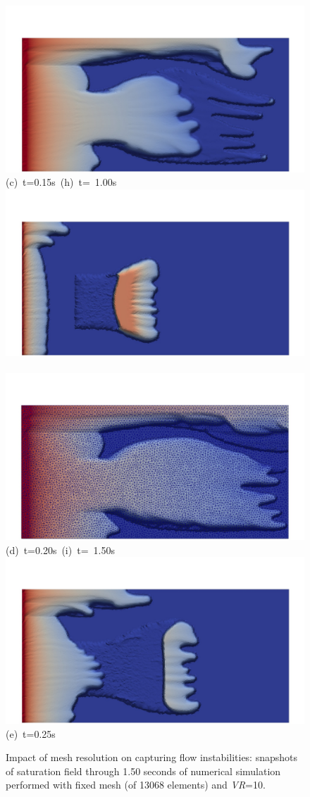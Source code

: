 \begin{figure}[ht]
{{            \includegraphics[width=.45\textwidth]{./Pics1/Section4_4/5r_po_left_inlet_D1000b.pdf}}
      \vspace{-.1cm}\hbox{\hspace{2.cm}(c) t=0.15s \hspace{4cm} (h) t= 1.00s}\vspace{-.1cm}
      \hbox{\includegraphics[width=.45\textwidth]{./Pics1/Section4_4/5r_po_left_inlet_D200b.pdf} 
            \includegraphics[width=.45\textwidth]{./Pics1/Section4_4/5r_po_left_inlet_D1500b.pdf}}
      \vspace{-.1cm}\hbox{\hspace{2.cm}(d) t=0.20s \hspace{4cm} (i) t= 1.50s}\vspace{-.1cm}
      \hbox{\includegraphics[width=.45\textwidth]{./Pics1/Section4_4/5r_po_left_inlet_D250b.pdf}}
      \vspace{-.1cm}\hbox{\hspace{2.cm}(e) t=0.25s}\vspace{-.1cm}}
\caption{Impact of mesh resolution on capturing flow instabilities: snapshots of saturation field through 1.50 seconds of numerical simulation performed with fixed mesh (of 13068 elements) and {\it VR}=10.}
\label{fig:5regions_fixedmesh}
\end{figure}
\clearpage


